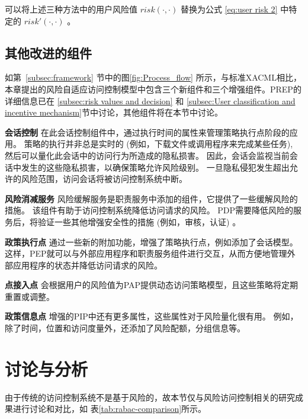 可以将上述三种方法中的用户风险值 $risk(\cdot,\cdot)$ 替换为公式 \ref{eq:user risk 2} 中特定的 $risk'(\cdot,\cdot)$ 。

\subsection{其他改进的组件}
\label{subsec:Other improved components}
如第~\ref{subsec:framework} 节中的图\ref{fig:Process_flow} 所示，与标准XACML相比，本章提出的风险自适应访问控制模型中包含三个新组件和三个增强组件。PREP的详细信息已在 \ref{subsec:risk values and decision} 和 \ref{subsec:User classification and incentive mechanism}节中讨论，其他组件将在本节中讨论。

\textbf{会话控制} 在此会话控制组件中，通过执行时间的属性来管理策略执行点阶段的应用。 策略的执行并非总是实时的 (例如，下载文件或调用程序来完成某些任务), 然后可以量化此会话中的访问行为所造成的隐私损害。 因此，会话会监视当前会话中发生的这些隐私损害，以确保策略允许风险级别。 一旦隐私侵犯发生超出允许的风险范围，访问会话将被访问控制系统中断。

\textbf{风险消减服务} 风险缓解服务是职责服务中添加的组件，它提供了一些缓解风险的措施。 该组件有助于访问控制系统降低访问请求的风险。 PDP需要降低风险的服务后，将验证一些其他增强安全性的措施 (例如，审核，认证) 。

\textbf{政策执行点} 通过一些新的附加功能，增强了策略执行点，例如添加了会话模型。 这样，PEP就可以与外部应用程序和职责服务组件进行交互，从而方便地管理外部应用程序的状态并降低访问请求的风险。

\textbf{点接入点} 会根据用户的风险值为PAP提供动态访问策略模型，且这些策略将定期重置或调整。

\textbf{政策信息点} 增强的PIP中还有更多属性，这些属性对于风险量化很有用。 例如，除了时间，位置和访问度量外，还添加了风险配额，分组信息等。

\section{讨论与分析}
\label{sec:Discussion and analysis}
由于传统的访问控制系统不是基于风险的，故本节仅与风险访问控制相关的研究成果进行讨论和对比，如 表\ref{tab:rabac-comparison}所示。

